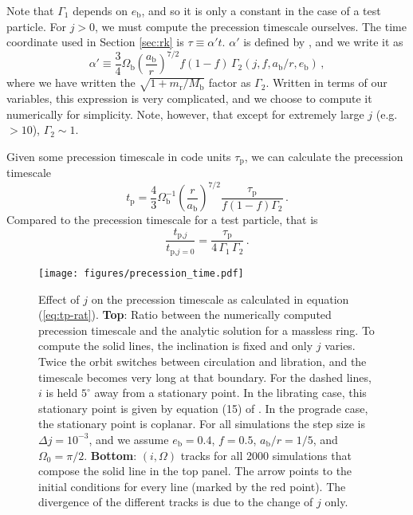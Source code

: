 \documentclass[twocolumn,linenumbers]{aastex631}
\begin{document}
Note that $\Gamma_1$ depends on $e_\text{b}$, and so it is only a constant in the case of a test particle. For $j>0$, we must compute the precession timescale ourselves. The time coordinate used in Section \ref{sec:rk} is $\tau \equiv \alpha' t$. $\alpha'$ is defined by \citet[see eq. 3.9]{farago2010}, and we write it as
\begin{equation}
    \alpha' \equiv \frac{3}{4} \Omega_\text{b} \left(\frac{a_\text{b}}{r}\right)^{7/2} f(1-f) \,\Gamma_2(j,f,a_\text{b}/r, e_\text{b}) \, ,
\end{equation}
where we have written the $\sqrt{1+m_\text{r}/M_\text{b}}$ factor as $\Gamma_2$. Written in terms of our variables, this expression is very complicated, and we choose to compute it numerically for simplicity. Note, however, that except for extremely large $j$ (e.g. $>10$), $\Gamma_2 \sim 1$.

Given some precession timescale in code units $\tau_\text{p}$, we can calculate the precession timescale
\begin{equation}
    \label{eq:tp-j}
    t_\text{p} = \frac{4}{3}\Omega_\text{b}^{-1} \left(\frac{r}{a_\text{b}}\right)^{7/2} \frac{\tau_\text{p}}{f(1-f)\Gamma_2}\, .
\end{equation}
Compared to the precession timescale for a test particle, that is
\begin{equation}
    \label{eq:tp-rat}
    \frac{t_{\text{p,}j}}{t_{\text{p,}j=0}} = \frac{\tau_\text{p}}{4\,\Gamma_1\,\Gamma_2} \, .
\end{equation}

\begin{figure}
    \texttt{[image: figures/precession\_time.pdf]}
    \caption{
        Effect of $j$ on the precession timescale as calculated in equation (\ref{eq:tp-rat}). {\bf Top}: Ratio between the numerically computed precession timescale and the analytic solution for a massless ring. To compute the solid lines, the inclination is fixed and only $j$ varies. Twice the orbit switches between circulation and libration, and the timescale becomes very long at that boundary. For the dashed lines, $i$ is held $5^\circ$ away from a stationary point. In the librating case, this stationary point is given by equation (15) of \citet{martin2019}. In the prograde case, the stationary point is coplanar. For all simulations the step size is $\Delta j = 10^{-3}$, and we assume $e_\text{b}=0.4$, $f=0.5$, $a_\text{b}/r = 1/5$, and $\Omega_0 = \pi/2$. {\bf Bottom}: $(i,\Omega)$ tracks for all 2000 simulations that compose the solid line in the top panel. The arrow points to the initial conditions for every line (marked by the red point). The divergence of the different tracks is due to the change of $j$ only.
    }
    \label{fig:t_p}
\end{figure}
\end{document}
